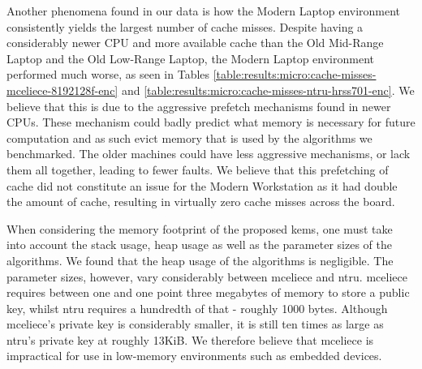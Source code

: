Another phenomena found in our data is how the Modern Laptop environment consistently yields the largest number of cache misses. Despite having a considerably newer CPU and more available cache than the Old Mid-Range Laptop and the Old Low-Range Laptop, the Modern Laptop environment performed much worse, as seen in Tables \ref{table:results:micro:cache-misses-mceliece-8192128f-enc} and \ref{table:results:micro:cache-misses-ntru-hrss701-enc}. We believe that this is due to the aggressive prefetch mechanisms found in newer CPUs. These mechanism could badly predict what memory is necessary for future computation and as such evict memory that is used by the algorithms we benchmarked. The older machines could have less aggressive mechanisms, or lack them all together, leading to fewer faults. We believe that this prefetching of cache did not constitute an issue for the Modern Workstation as it had double the amount of cache, resulting in virtually zero cache misses across the board.

When considering the memory footprint of the proposed \glspl{kem}, one must take into account the stack usage, heap usage as well as the parameter sizes of the algorithms. We found that the heap usage of the algorithms is negligible. The parameter sizes, however, vary considerably between \gls{mceliece} and \gls{ntru}. \gls{mceliece} requires between one and one point three megabytes of memory to store a public key, whilst \gls{ntru} requires a hundredth of that - roughly 1000 bytes. Although \gls{mceliece}'s private key is considerably smaller, it is still ten times as large as \gls{ntru}'s private key at roughly 13KiB. We therefore believe that \gls{mceliece} is impractical for use in low-memory environments such as embedded devices.

